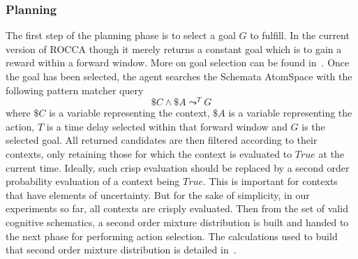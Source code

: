 \documentclass[runningheads]{llncs}
\newcommand{\TTrue}{\textit{True}}
\newcommand{\lpreimp}[1]{\leadsto^{#1}}
\begin{document}
\subsubsection{Planning}
The first step of the planning phase is to select a goal $G$ to
fulfill.  In the current version of ROCCA though it merely returns a
constant goal which is to gain a reward within a forward window.  More
on goal selection can be found in~\cite{Goertzel2014EGI1, Hahm2021}.
Once the goal has been selected, the agent searches the Schemata
AtomSpace with the following pattern matcher query
$$\$C \land \$A \lpreimp{T} G$$
where
$\$C$ is a variable representing the context, $\$A$ is a variable
representing the action,
$T$ is a time delay selected within that forward window and $G$ is the
selected goal.  All returned candidates are then filtered according to
their contexts, only retaining those for which the context is
evaluated to $\TTrue$ at the current time.  Ideally, such crisp
evaluation should be replaced by a second order probability evaluation
of a context being $\TTrue$.  This is important for contexts that have
elements of uncertainty.  But for the sake of simplicity, in our
experiments so far, all contexts are crisply evaluated.  Then from the
set of valid cognitive schematics, a second order mixture distribution
is built and handed to the next phase for performing action selection.
The calculations used to build that second order mixture distribution
is detailed in~\cite{Geisweiller2018}.
\end{document}
